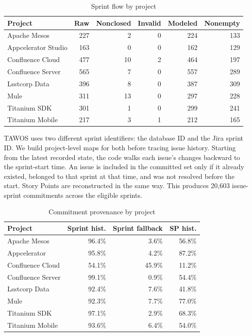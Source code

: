 \documentclass[conference]{IEEEtran}
\begin{document}
\begin{table}[!htb]
\centering\scriptsize
\caption{Sprint flow by project}
\label{tab:flow}
\setlength{\tabcolsep}{2.1pt}
\begin{tabular}{@{}p{2.0cm}rrrrr@{}}
\toprule
Project & Raw & Nonclosed & Invalid & Modeled & Nonempty\\
\midrule
Apache Mesos & 227 & 2 & 0 & 224 & 133\\
Appcelerator Studio & 163 & 0 & 0 & 162 & 129\\
Confluence Cloud & 477 & 10 & 2 & 464 & 197\\
Confluence Server & 565 & 7 & 0 & 557 & 289\\
Lsstcorp Data & 396 & 8 & 0 & 387 & 309\\
Mule & 311 & 13 & 0 & 297 & 228\\
Titanium SDK & 301 & 1 & 0 & 299 & 241\\
Titanium Mobile & 217 & 3 & 1 & 212 & 165\\
\bottomrule
\end{tabular}
\end{table}

TAWOS uses two different sprint identifiers: the database ID and the Jira sprint ID. We build project-level maps for both before tracing issue history. Starting from the latest recorded state, the code walks each issue's changes backward to the sprint-start time. An issue is included in the committed set only if it already existed, belonged to that sprint at that time, and was not resolved before the start. Story Points are reconstructed in the same way. This produces 20,603 issue-sprint commitments across the eligible sprints.

\begin{table}[!htb]
\centering\scriptsize
\caption{Commitment provenance by project}
\label{tab:provproj}
\setlength{\tabcolsep}{2.2pt}
\begin{tabular}{@{}p{2.0cm}rrr@{}}
\toprule
Project & Sprint hist. & Sprint fallback & SP hist.\\
\midrule
Apache Mesos & 96.4\% & 3.6\% & 56.8\%\\
Appcelerator & 95.8\% & 4.2\% & 87.2\%\\
Confluence Cloud & 54.1\% & 45.9\% & 11.2\%\\
Confluence Server & 99.1\% & 0.9\% & 54.4\%\\
Lsstcorp Data & 92.4\% & 7.6\% & 41.8\%\\
Mule & 92.3\% & 7.7\% & 77.0\%\\
Titanium SDK & 97.1\% & 2.9\% & 68.3\%\\
Titanium Mobile & 93.6\% & 6.4\% & 54.0\%\\
\bottomrule
\end{tabular}
\end{table}
\end{document}
